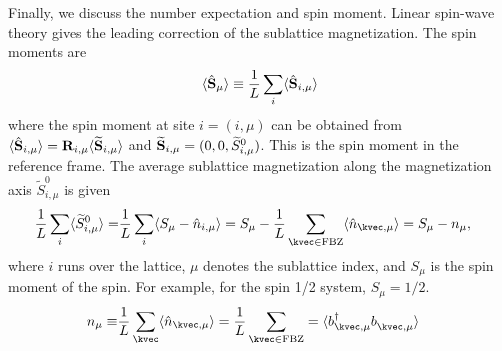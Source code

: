 Finally, we discuss the number expectation and spin moment. 
Linear spin-wave theory gives the leading correction of the sublattice magnetization. 
The spin moments are 
\begin{equation}
    \langle \hat{\bf S}_{\mu} \rangle 
    \equiv \frac{1}{L} \sum_{i} \langle \hat{\bf S}_{i, \mu} \rangle
\end{equation}
where the spin moment at site $i=(i,\mu)$ can be obtained from $\langle \hat{\bf S}_{i, \mu} \rangle = \mathbf{R}_{i,\mu} \langle \widetilde{\bf S}_{i,\mu} \rangle$ and $\widetilde{\bf S}_{i,\mu} = (0, 0, \widetilde{S}^{0}_{i,\mu})$. 
This is the spin moment in the reference frame.
The average sublattice magnetization along the magnetization axis $\widetilde{S}^{0}_{i,\mu}$ is given
\begin{align*}
    \frac{1}{L} \sum_{i} \langle \widetilde{S}^{0}_{i, \mu} \rangle 
    = & \frac{1}{L} \sum_{i} \langle S_{\mu} -  \hat{n}_{i, \mu} \rangle 
    = S_{\mu} - \frac{1}{L} \sum_{\kvec \in \mathrm{FBZ}}  \langle \hat{n}_{\kvec, \mu}  \rangle
    = S_{\mu} - n_{\mu},
\end{align*}
where $i$ runs over the lattice, $\mu$ denotes the sublattice index, and $S_{\mu}$ is the spin moment of the spin. 
For example, for the spin 1/2 system, $S_\mu = 1/2$.
\begin{align}
    n_{\mu} \equiv & \frac{1}{L} \sum_{\kvec}  \langle \hat{n}_{\kvec, \mu} \rangle 
    = \frac{1}{L} \sum_{\kvec \in \mathrm{FBZ}} 
    = \langle b^{\dagger}_{\kvec, \mu} b_{\kvec, \mu}^{\phantom \dagger} \rangle  
\end{align}

